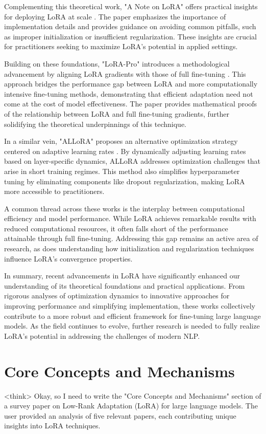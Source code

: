 \documentclass[conference]{IEEEtran}
\begin{document}
Complementing this theoretical work, "A Note on LoRA" offers practical insights for deploying LoRA at scale \cite{bX}. The paper emphasizes the importance of implementation details and provides guidance on avoiding common pitfalls, such as improper initialization or insufficient regularization. These insights are crucial for practitioners seeking to maximize LoRA's potential in applied settings.

Building on these foundations, "LoRA-Pro" introduces a methodological advancement by aligning LoRA gradients with those of full fine-tuning \cite{bX}. This approach bridges the performance gap between LoRA and more computationally intensive fine-tuning methods, demonstrating that efficient adaptation need not come at the cost of model effectiveness. The paper provides mathematical proofs of the relationship between LoRA and full fine-tuning gradients, further solidifying the theoretical underpinnings of this technique.

In a similar vein, "ALLoRA" proposes an alternative optimization strategy centered on adaptive learning rates \cite{bX}. By dynamically adjusting learning rates based on layer-specific dynamics, ALLoRA addresses optimization challenges that arise in short training regimes. This method also simplifies hyperparameter tuning by eliminating components like dropout regularization, making LoRA more accessible to practitioners.

A common thread across these works is the interplay between computational efficiency and model performance. While LoRA achieves remarkable results with reduced computational resources, it often falls short of the performance attainable through full fine-tuning. Addressing this gap remains an active area of research, as does understanding how initialization and regularization techniques influence LoRA's convergence properties.

In summary, recent advancements in LoRA have significantly enhanced our understanding of its theoretical foundations and practical applications. From rigorous analyses of optimization dynamics to innovative approaches for improving performance and simplifying implementation, these works collectively contribute to a more robust and efficient framework for fine-tuning large language models. As the field continues to evolve, further research is needed to fully realize LoRA's potential in addressing the challenges of modern NLP.

\section{Core Concepts and Mechanisms}
<think>
Okay, so I need to write the "Core Concepts and Mechanisms" section of a survey paper on Low-Rank Adaptation (LoRA) for large language models. The user provided an analysis of five relevant papers, each contributing unique insights into LoRA techniques.
\end{document}

